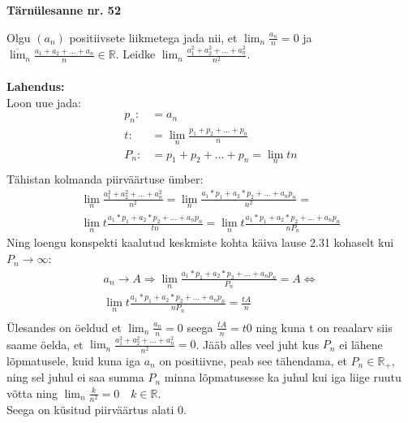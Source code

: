 \documentclass{article}
\begin{document}
\begin{center}
\Large\textbf{T\"arn\"ulesanne nr. 52}\\
\end{center}
Olgu $(a_n)$ positiivsete liikmetega jada nii, et $\displaystyle\lim_n \frac{a_n}{n}=0$ ja\\ $\displaystyle\overline\lim_n \frac{a_1+a_2+...+a_n}{n}\in\mathbb{R}$. Leidke $\displaystyle\lim_n \frac{a_1^2+a_2^2+...+a_n^2}{n^2}$.\\\\
\textbf{Lahendus:}\\
Loon uue jada:
\begin{equation*}
\begin{aligned}
p_n:&=a_n\\
t:&=\lim_n \frac{p_1+p_2+...+p_n}{n}\\
P_n:&=p_1+p_2+...+p_n=\lim_n tn\\
\end{aligned}
\end{equation*}
T\"ahistan kolmanda piirv\"a\"artuse \"umber:
\begin{equation*}
\begin{aligned}
\lim_n \frac{a_1^2+a_2^2+...+a_n^2}{n^2}=\lim_n \frac{a_1*p_1+a_2*p_2+...+a_np_n}{n^2}=\\
\lim_n t\frac{a_1*p_1+a_2*p_2+...+a_np_n}{tn}=\lim_n t\frac{a_1*p_1+a_2*p_2+...+a_np_n}{nP_n}
\end{aligned}
\end{equation*}
Ning loengu konspekti kaalutud keskmiste kohta k\"aiva lause 2.31 kohaselt kui $P_n\rightarrow\infty$:
\begin{equation*}
\begin{aligned}
a_n\rightarrow A\Rightarrow\lim_n \frac{a_1*p_1+a_2*p_2+...+a_np_n}{P_n}= A\iff\\
\lim_n t\frac{a_1*p_1+a_2*p_2+...+a_np_n}{nP_n}= \frac{tA}{n}\\
\end{aligned}
\end{equation*}
\"Ulesandes on \"oeldud et $\displaystyle\lim_n \frac{a_n}{n}=0$ seega $\frac{tA}{n}=t0$ ning kuna t on reaalarv siis saame \"oelda, et $\displaystyle\lim_n \frac{a_1^2+a_2^2+...+a_n^2}{n^2}= 0$. J\"a\"ab alles veel juht kus $P_n$ ei l\"ahene l\~opmatusele, kuid kuna iga $a_n$ on positiivne, peab see t\"ahendama, et $P_n\in\mathbb{R}_+$, ning sel juhul ei saa summa $P_n$ minna l\~opmatusesse ka juhul kui iga liige ruutu v\~otta ning $\displaystyle\lim_n \frac{k}{n^2}=0\quad k\in\mathbb{R}$.\\
Seega on k\"usitud piirv\"a\"artus alati 0.
\end{document}
